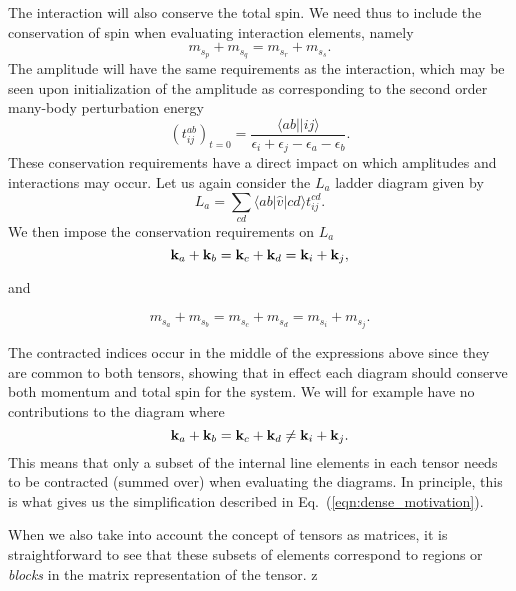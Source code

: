 The interaction will also conserve the total spin. We need thus to include the conservation of spin when evaluating
interaction elements, namely
\begin{equation}
m_{s_p}+  m_{s_q}=  m_{s_r} +m_{s_s}.
\label{eqn:spinconservation}
\end{equation}
The amplitude will have the same requirements as the interaction,
which may be seen upon initialization of the amplitude as
corresponding to the second order many-body perturbation energy
\begin{equation}
(t^{ab}_{ij})_{t=0} = \frac{\langle ab \vert \vert ij \rangle  }{\epsilon_i + \epsilon_j - \epsilon_a - \epsilon_b}.
\end{equation}
These conservation requirements have a direct impact on which
amplitudes and interactions may occur. Let us again consider the $L_a$
ladder diagram given by
\begin{equation}
L_a = \sum_{cd} \langle a b \vert \hat{v}\vert c d \rangle t^{cd}_{ij}.
\end{equation}
We then impose the conservation requirements on $L_a$
\begin{equation}
\bold{k}_a + \bold{k}_b = \bold{k}_c + \bold{k}_d =  \bold{k}_i + \bold{k}_j,
\end{equation}

and

\begin{equation}
m_{s_a}+  m_{s_b}=  m_{s_c} +m_{s_d} = m_{s_i} + m_{s_j}.
\end{equation}

The contracted indices occur in the middle of the expressions above
since they are common to both tensors, showing that in effect each
diagram should conserve both momentum and total spin for the
system. We will for example have no contributions to the diagram where
\begin{equation}
\bold{k}_a + \bold{k}_b = \bold{k}_c + \bold{k}_d \neq  \bold{k}_i + \bold{k}_j.
\end{equation}
This means that only a subset of the internal line elements in each tensor needs to be contracted (summed over) when evaluating the diagrams. In principle, this is what gives us the simplification described in Eq.~(\ref{eqn:dense_motivation}).

When we also take into account the concept of tensors as matrices, it
is straightforward to see that these subsets of elements correspond to
regions or \emph{blocks} in the matrix representation of the tensor. z


